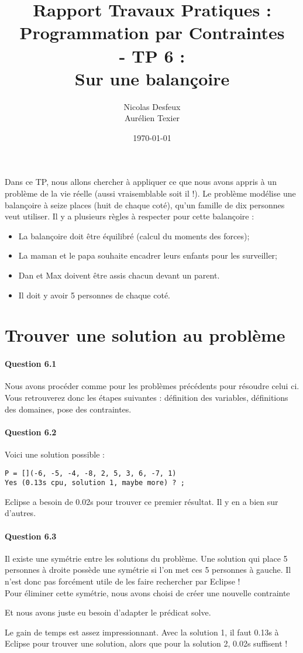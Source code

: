 \documentclass[11pt]{article} %
\date{\today}
\title{Rapport Travaux Pratiques : \\Programmation par Contraintes\\ - TP 6 : \\\textbf{Sur une balançoire}}
\author{Nicolas Desfeux\\Aurélien Texier}
\begin{document}
\lstset{language=Prolog,breaklines=true,numbers=left,basicstyle=\footnotesize ,numberstyle=\footnotesize}
\maketitle
\paragraph{} Dans ce TP, nous allons chercher à appliquer ce que nous avons appris à un problème de la vie réelle (aussi vraisemblable soit il !). Le problème modélise une balançoire à seize places (huit de chaque coté), qu'un famille de dix personnes veut utiliser. Il y a plusieurs règles à respecter pour cette balançoire : 
\begin{itemize}
\item La balançoire doit être équilibré (calcul du moments des forces);
\item La maman et le papa souhaite encadrer leurs enfants pour les surveiller;
\item Dan et Max doivent être assis chacun devant un parent.
\item Il doit y avoir 5 personnes de chaque coté.
\end{itemize}
\tableofcontents
\newpage
\section{Trouver une solution au problème}
\paragraph{Question 6.1} Nous avons procéder comme pour les problèmes précédents pour résoudre celui ci. Vous retrouverez donc les étapes suivantes : définition des variables, définitions des domaines, pose des contraintes.

\paragraph{Question 6.2} Voici une solution possible : \\
\begin{lstlisting}
P = [](-6, -5, -4, -8, 2, 5, 3, 6, -7, 1)
Yes (0.13s cpu, solution 1, maybe more) ? ;
\end{lstlisting}
Eclipse a besoin de 0.02s pour trouver ce premier résultat. Il y en a bien sur d'autres.
\paragraph{Question 6.3} Il existe une symétrie entre les solutions du problème. Une solution qui place 5 personnes à droite possède une symétrie si l'on met ces 5 personnes à gauche. Il n'est donc pas forcément utile de les faire rechercher par Eclipse !\\
Pour éliminer cette symétrie, nous avons choisi de créer une nouvelle contrainte

Et nous avons juste eu besoin d'adapter le prédicat solve.

Le gain de temps est assez impressionnant. Avec la solution 1, il faut 0.13s à Eclipse pour trouver une solution, alors que pour la solution 2, 0.02s suffisent !
\end{document}
